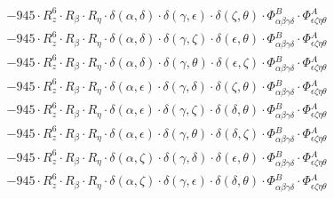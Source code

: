 \documentclass{article}
\begin{document}
\begin{equation}
\begin{array}{c}
 \\[0.2em] 		 - 945 \cdot R_{z}^{6} \cdot R_{\beta{}} \cdot R_{\eta{}} \cdot \delta{}\left(\alpha{}, \delta{}\right) \cdot \delta{}\left(\gamma{}, \epsilon{}\right) \cdot \delta{}\left(\zeta{}, \theta{}\right) \cdot \Phi{}^{B}_{\alpha{}\beta{}\gamma{}\delta{}} \cdot \Phi{}^{A}_{\epsilon{}\zeta{}\eta{}\theta{}} 
 \\[0.2em] 		 - 945 \cdot R_{z}^{6} \cdot R_{\beta{}} \cdot R_{\eta{}} \cdot \delta{}\left(\alpha{}, \delta{}\right) \cdot \delta{}\left(\gamma{}, \zeta{}\right) \cdot \delta{}\left(\epsilon{}, \theta{}\right) \cdot \Phi{}^{B}_{\alpha{}\beta{}\gamma{}\delta{}} \cdot \Phi{}^{A}_{\epsilon{}\zeta{}\eta{}\theta{}} 
 \\[0.2em] 		 - 945 \cdot R_{z}^{6} \cdot R_{\beta{}} \cdot R_{\eta{}} \cdot \delta{}\left(\alpha{}, \delta{}\right) \cdot \delta{}\left(\gamma{}, \theta{}\right) \cdot \delta{}\left(\epsilon{}, \zeta{}\right) \cdot \Phi{}^{B}_{\alpha{}\beta{}\gamma{}\delta{}} \cdot \Phi{}^{A}_{\epsilon{}\zeta{}\eta{}\theta{}} 
 \\[0.2em] 		 - 945 \cdot R_{z}^{6} \cdot R_{\beta{}} \cdot R_{\eta{}} \cdot \delta{}\left(\alpha{}, \epsilon{}\right) \cdot \delta{}\left(\gamma{}, \delta{}\right) \cdot \delta{}\left(\zeta{}, \theta{}\right) \cdot \Phi{}^{B}_{\alpha{}\beta{}\gamma{}\delta{}} \cdot \Phi{}^{A}_{\epsilon{}\zeta{}\eta{}\theta{}} 
 \\[0.2em] 		 - 945 \cdot R_{z}^{6} \cdot R_{\beta{}} \cdot R_{\eta{}} \cdot \delta{}\left(\alpha{}, \epsilon{}\right) \cdot \delta{}\left(\gamma{}, \zeta{}\right) \cdot \delta{}\left(\delta{}, \theta{}\right) \cdot \Phi{}^{B}_{\alpha{}\beta{}\gamma{}\delta{}} \cdot \Phi{}^{A}_{\epsilon{}\zeta{}\eta{}\theta{}} 
 \\[0.2em] 		 - 945 \cdot R_{z}^{6} \cdot R_{\beta{}} \cdot R_{\eta{}} \cdot \delta{}\left(\alpha{}, \epsilon{}\right) \cdot \delta{}\left(\gamma{}, \theta{}\right) \cdot \delta{}\left(\delta{}, \zeta{}\right) \cdot \Phi{}^{B}_{\alpha{}\beta{}\gamma{}\delta{}} \cdot \Phi{}^{A}_{\epsilon{}\zeta{}\eta{}\theta{}} 
 \\[0.2em] 		 - 945 \cdot R_{z}^{6} \cdot R_{\beta{}} \cdot R_{\eta{}} \cdot \delta{}\left(\alpha{}, \zeta{}\right) \cdot \delta{}\left(\gamma{}, \delta{}\right) \cdot \delta{}\left(\epsilon{}, \theta{}\right) \cdot \Phi{}^{B}_{\alpha{}\beta{}\gamma{}\delta{}} \cdot \Phi{}^{A}_{\epsilon{}\zeta{}\eta{}\theta{}} 
 \\[0.2em] 		 - 945 \cdot R_{z}^{6} \cdot R_{\beta{}} \cdot R_{\eta{}} \cdot \delta{}\left(\alpha{}, \zeta{}\right) \cdot \delta{}\left(\gamma{}, \epsilon{}\right) \cdot \delta{}\left(\delta{}, \theta{}\right) \cdot \Phi{}^{B}_{\alpha{}\beta{}\gamma{}\delta{}} \cdot \Phi{}^{A}_{\epsilon{}\zeta{}\eta{}\theta{}} 

\end{array}
\end{equation}
\end{document}
